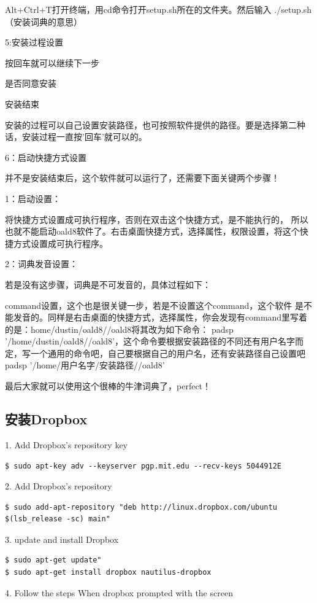 Alt+Ctrl+T打开终端，用cd命令打开setup.sh所在的文件夹。然后输入 ./setup.sh（安装词典的意思）

5:安装过程设置

按回车就可以继续下一步

是否同意安装

安装结束

安装的过程可以自己设置安装路径，也可按照软件提供的路径。要是选择第二种话，安装过程一直按'回车'就可以的。

6：启动快捷方式设置

并不是安装结束后，这个软件就可以运行了，还需要下面关键两个步骤！

1：启动设置：

将快捷方式设置成可执行程序，否则在双击这个快捷方式，是不能执行的， 所以也就不能启动oald8软件了。右击桌面快捷方式，选择属性，权限设置，将这个快捷方式设置成可执行程序。

2：词典发音设置：

若是没有这步骤，词典是不可发音的，具体过程如下：

command设置，这个也是很关键一步，若是不设置这个command，这个软件  是不能发音的。同样是右击桌面的快捷方式，选择属性，你会发现有command里写着的是：home/dustin/oald8//oald8将其改为如下命令：    padsp '/home/dustin/oald8//oald8'，这个命令要根据安装路径的不同还有用户名字而定，写一个通用的命令吧，自己要根据自己的用户名，还有安装路径自己设置吧padsp '/home/用户名字/安装路径//oald8'

最后大家就可以使用这个很棒的牛津词典了，perfect！

\subsection{安装Dropbox}
1. Add Dropbox’s repository key

\verb"$ sudo apt-key adv --keyserver pgp.mit.edu --recv-keys 5044912E"

2. Add Dropbox’s repository
\begin{verbatim}
$ sudo add-apt-repository "deb http://linux.dropbox.com/ubuntu $(lsb_release -sc) main"
\end{verbatim}

3. update and install Dropbox

\begin{verbatim}
$ sudo apt-get update"
$ sudo apt-get install dropbox nautilus-dropbox
\end{verbatim}

4. Follow the steps When dropbox prompted with the screen

